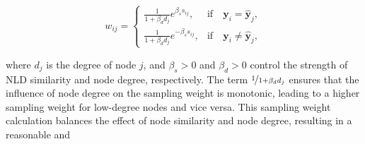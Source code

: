 \documentclass[letterpaper]{article} %
\newcommand{\aVec}[1]{\mathbf{#1}}
\begin{document}
\begin{small}
	\begin{equation}
	w_{ij} = 
	\begin{cases}
	\frac{1}{1 + \beta_{d}d_{j}}e^{\beta_{s} s_{ij}}, & \text{if} \quad \aVec{y}_{i} = \hat{\aVec{y}}_{j}, \\
   \frac{1}{1 + \beta_{d}d_{j}}e^{-\beta_{s} s_{ij}}, & \text{if} \quad \aVec{y}_{i} \neq \hat{\aVec{y}}_{j},	
	\end{cases}
\end{equation}
\end{small}where $d_{j}$ is the degree of node $j$, and $\beta_{s} > 0$ and $\beta_{d} > 0$ control the strength of NLD similarity and node degree, respectively. The term $\nicefrac{1}{1 + \beta_{d}d_{j}}$ ensures that the influence of node degree on the sampling weight is monotonic, leading to a higher sampling weight for low-degree nodes and vice versa. This sampling weight calculation balances the effect of node similarity and node degree, resulting in a reasonable and
\end{document}
